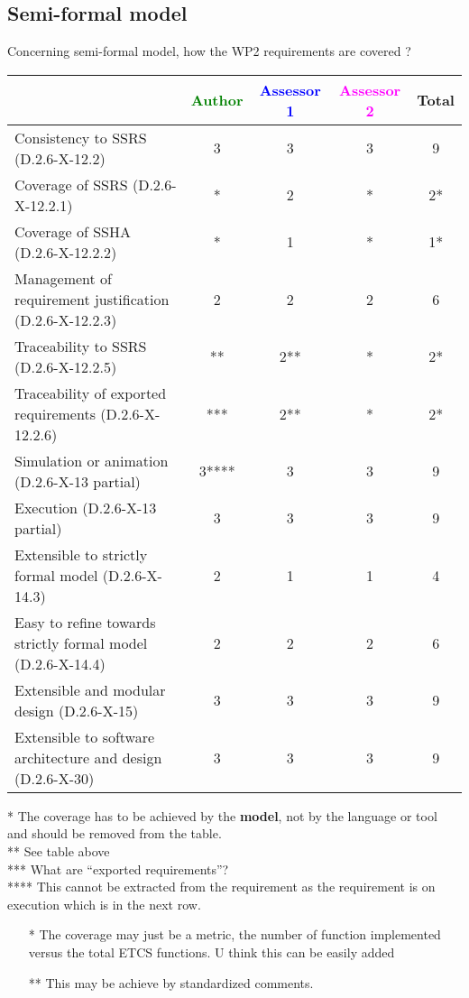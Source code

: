 \subsection{Semi-formal model}

Concerning semi-formal model, how the WP2 requirements are covered ?

\begin{tabular}{|l | c | c | c | c|}
\hline
& \textcolor{green}{Author} & \textcolor{blue}{Assessor 1} & \textcolor{magenta}{Assessor 2} & Total \\
\hline
Consistency to SSRS (D.2.6-X-12.2) &3 &3 &3 & 9 \\
\hline
Coverage of SSRS (D.2.6-X-12.2.1) &* &2 &* & 2* \\
\hline
Coverage of SSHA (D.2.6-X-12.2.2) &* &1 &* & 1* \\
\hline
Management of requirement justification (D.2.6-X-12.2.3) &2 &2 &2 & 6 \\
\hline
Traceability to SSRS (D.2.6-X-12.2.5) &** &2** &* & 2* \\
\hline
Traceability of exported requirements (D.2.6-X-12.2.6) &*** & 2**&* & 2* \\
\hline
Simulation or animation (D.2.6-X-13 partial) &3**** & 3 &3 & 9 \\
\hline
Execution (D.2.6-X-13 partial) &3 &3 &3 & 9 \\
\hline
Extensible to strictly formal model (D.2.6-X-14.3) &2 &1 &1 & 4 \\
\hline
Easy to refine towards strictly formal model (D.2.6-X-14.4) &2 &2 &2 & 6 \\
\hline
Extensible and modular design (D.2.6-X-15) &3 &3 &3 & 9 \\
\hline
Extensible to software architecture and design (D.2.6-X-30) &3 &3 &3 & 9 \\
\hline
\end{tabular}

\begin{author_comment}
* The coverage has to be achieved by the \textbf{model}, not by the language or tool and should be removed from the table.\\
** See table above\\
*** What are ``exported requirements''?\\
**** This cannot be extracted from the requirement as the requirement is on execution which is in the next row.
\end{author_comment}
\begin{assessor1}
\begin{itemize}
\item[*] The coverage may just be a metric, the number of function
  implemented versus the total ETCS functions. U think this can be
  easily added
\item[**] This may be achieve by standardized comments.
\end{itemize}
\end{assessor1}

